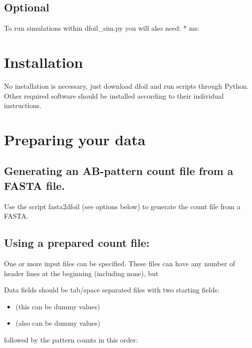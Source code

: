 \documentclass[letterpaper,12pt,english]{sphinxmanual}
\begin{document}
\subsection{Optional}
\label{\detokenize{intro:optional}}
To run simulations within dfoil\_sim.py you will also need:
* ms: 


\section{Installation}
\label{\detokenize{intro:installation}}
No installation is necessary, just download dfoil and run scripts through Python.
Other required software should be installed according to their individual instructions.


\section{Preparing your data}
\label{\detokenize{intro:preparing-your-data}}

\subsection{Generating an AB-pattern count file from a FASTA file.}
\label{\detokenize{intro:generating-an-ab-pattern-count-file-from-a-fasta-file}}
Use the script fasta2dfoil (see options below) to generate the count file from a FASTA.


\subsection{Using a prepared count file:}
\label{\detokenize{intro:using-a-prepared-count-file}}
One or more input files can be specified. These files can have any number of header lines at the beginning (including none), but 

Data fields should be tab/space separated files with two starting fields:
\begin{itemize}
\item {} 
 (this can be dummy values)

\item {} 
 (also can be dummy values)

\end{itemize}

followed by the pattern counts in this order:
\end{document}
